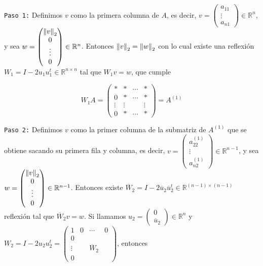 \texttt{Paso 1:} Definimos $v$ como la primera columna de $A$, es decir, $v = \begin{pmatrix} a_{11} \\ \vdots \\ a_{n1} \end{pmatrix} \in \mathbb{R}^{n}$, y sea $w = \begin{pmatrix}\left\lVert v\right\rVert_2 \\ 0 \\ \vdots \\ 0 \end{pmatrix} \in \mathbb{R}^{n}$. Entonces $\left\lVert v\right\rVert_2 = \left\lVert w\right\rVert_2$ con lo cual existe una reflexión $W_1 = I - 2u_1u_1^t \in \mathbb{R}^{n \times n}$ tal que $W_1v = w$, que cumple

\[W_1 A = \begin{pmatrix}
* & * & \cdots & *\\
0 & * & \cdots & *\\
\vdots & \vdots & & \vdots \\
0 & * & \cdots & *
\end{pmatrix} = A^{(1)}\]

\texttt{Paso 2:} Definimos $v$ como la primer columna de la submatriz de $A^{(1)}$ que se obtiene sacando su primera fila y columna, es decir, $v = \begin{pmatrix}a^{(1)}_{22} \\ \vdots \\ a^{(1)}_{n2} \end{pmatrix} \in \mathbb{R}^{n - 1}$, y sea $w = \begin{pmatrix}\left\lVert v\right\rVert_2 \\ 0 \\ \vdots \\ 0 \end{pmatrix} \in \mathbb{R}^{n - 1}$. Entonces existe $\overline{W}_2 = I - 2\overline{u}_2\overline{u}_2^t \in \mathbb{R}^{(n - 1) \times (n - 1)}$ reflexión tal que $\overline{W}_2v = w$. Si llamamos $u_2 = \begin{pmatrix}0 \\ \overline{u}_2\end{pmatrix} \in \mathbb{R}^n$ y $W_2 = I - 2u_2u_2^t = \begin{pmatrix}1 & 0 & \cdots & 0 \\ 0 & &  & \\
\vdots & & \overline{W}_2 & \\ 0 & & &\end{pmatrix}$, entonces

